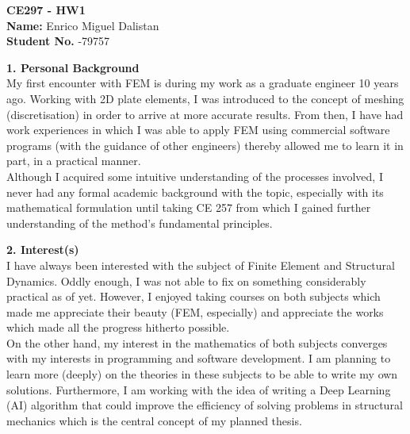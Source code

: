 \documentclass[12pt,a4paper]{article}
\begin{document}
\noindent \textbf{CE297 - HW1} \\
\textbf{Name:} \noindent Enrico Miguel Dalistan \\
\textbf{Student No.} -79757\\
\bigskip
\bigskip
\bigskip

\noindent \textbf{1. Personal Background} \\

\noindent My first encounter with FEM is during my work as a graduate engineer 10 years ago.
Working with 2D plate elements, I was introduced to the concept of meshing (discretisation)
in order to arrive at more accurate results. From then, I have had work experiences in which
I was able to apply FEM using commercial software programs (with the guidance of other engineers)
thereby allowed me to learn it in part, in a practical manner.\\

\noindent Although I acquired some intuitive understanding of the processes involved, I never had any formal academic background with the topic, especially with its
mathematical formulation until taking CE 257 from which I gained further understanding of
the method's fundamental principles. \\
\bigskip

\noindent \textbf{2. Interest(s)}\\

\noindent I have always been interested with the subject of Finite Element and Structural Dynamics.
Oddly enough, I was not able to fix on something considerably practical as of yet. However, I enjoyed taking courses on
both subjects which made me appreciate their beauty (FEM, especially) and appreciate the works which made
all the progress hitherto possible.\\

\noindent On the other hand, my interest in the mathematics of both subjects converges with my interests
in programming and software development. I am planning to learn more (deeply) on the theories in these subjects
to be able to write my own solutions. Furthermore, I am working with the idea of writing a Deep Learning (AI)
algorithm that could improve the efficiency of solving problems in structural mechanics
which is the central concept of my planned thesis. \\
\bigskip
\end{document}
